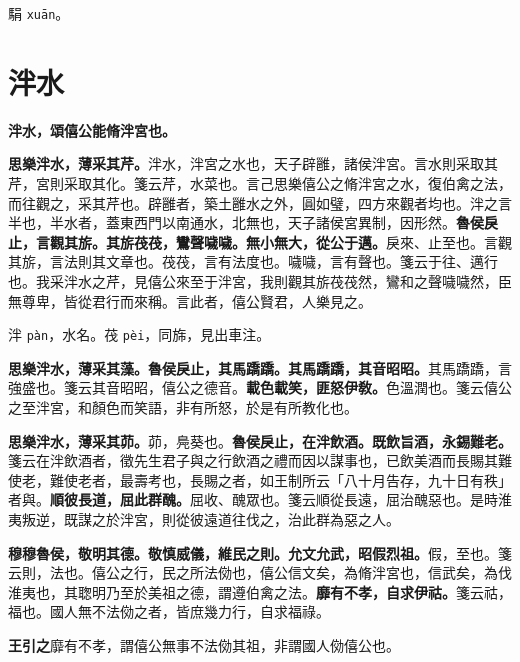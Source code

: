 \begin{quoting}駽 \texttt{xuān}。\end{quoting}

\section{泮水}


\textbf{泮水，頌僖公能脩泮宮也。}

\textbf{思樂泮水，薄采其芹。}{\footnotesize 泮水，泮宮之水也，天子辟雝，諸侯泮宮。言水則采取其芹，宮則采取其化。箋云芹，水菜也。言己思樂僖公之脩泮宮之水，復伯禽之法，而往觀之，采其芹也。辟雝者，築土雝水之外，圓如璧，四方來觀者均也。泮之言半也，半水者，蓋東西門以南通水，北無也，天子諸侯宮異制，因形然。}\textbf{魯侯戾止，言觀其旂。其旂茷茷，鸞聲噦噦。無小無大，從公于邁。}{\footnotesize 戾來、止至也。言觀其旂，言法則其文章也。茷茷，言有法度也。噦噦，言有聲也。箋云于往、邁行也。我采泮水之芹，見僖公來至于泮宮，我則觀其旂茷茷然，鸞和之聲噦噦然，臣無尊卑，皆從君行而來稱。言此者，僖公賢君，人樂見之。}

\begin{quoting}泮 \texttt{pàn}，水名。茷 \texttt{pèi}，同旆，見出車注。\end{quoting}

\textbf{思樂泮水，薄采其藻。魯侯戾止，其馬蹻蹻。其馬蹻蹻，其音昭昭。}{\footnotesize 其馬蹻蹻，言強盛也。箋云其音昭昭，僖公之德音。}\textbf{載色載笑，匪怒伊敎。}{\footnotesize 色溫潤也。箋云僖公之至泮宮，和顏色而笑語，非有所怒，於是有所教化也。}

\textbf{思樂泮水，薄采其茆。}{\footnotesize 茆，鳧葵也。}\textbf{魯侯戾止，在泮飲酒。既飲旨酒，永錫難老。}{\footnotesize 箋云在泮飲酒者，徵先生君子與之行飲酒之禮而因以謀事也，已飲美酒而長賜其難使老，難使老者，最壽考也，長賜之者，如王制所云「八十月告存，九十日有秩」者與。}\textbf{順彼長道，屈此群醜。}{\footnotesize 屈收、醜眾也。箋云順從長遠，屈治醜惡也。是時淮夷叛逆，既謀之於泮宮，則從彼遠道往伐之，治此群為惡之人。}

\textbf{穆穆魯侯，敬明其德。敬慎威儀，維民之則。允文允武，昭假烈祖。}{\footnotesize 假，至也。箋云則，法也。僖公之行，民之所法俲也，僖公信文矣，為脩泮宮也，信武矣，為伐淮夷也，其聦明乃至於美祖之德，謂遵伯禽之法。}\textbf{靡有不孝，自求伊祜。}{\footnotesize 箋云祜，福也。國人無不法俲之者，皆庶幾力行，自求福祿。}

\begin{quoting}\textbf{王引之}靡有不孝，謂僖公無事不法俲其祖，非謂國人俲僖公也。\end{quoting}

